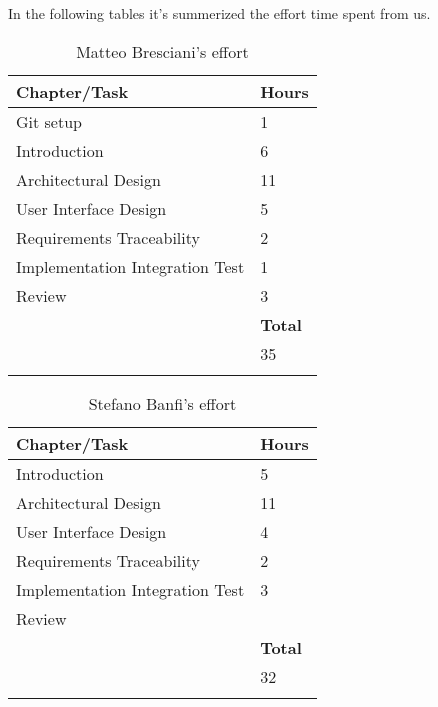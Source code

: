 In the following tables it's summerized the effort time spent from us. 

	\begin{longtable}{| p{5 cm} | p{1 cm} |} 
			\hline
			{\bf Chapter/Task} & {\bf Hours}\\
			\hline
            Git setup & 1 \\
			Introduction & 6 \\
			Architectural Design & 11 \\
			User Interface Design & 5\\
			Requirements Traceability & 2 \\
			Implementation Integration Test & 1 \\
            Review & 3 \\
			\hline
			&  {\bf Total} \\
			\hline
			&  35 \\
			\hline
			\caption{Matteo Bresciani's effort}
		\end{longtable}

			\begin{longtable}{| p{5 cm} | p{1 cm} |} 
			\hline
			{\bf Chapter/Task} & {\bf Hours}\\
			\hline
			Introduction & 5 \\
			Architectural Design & 11 \\
			User Interface Design & 4 \\
			Requirements Traceability & 2 \\
			Implementation Integration Test & 3 \\
            Review & \\
			\hline
			&  {\bf Total} \\
			\hline
			&  32 \\
			\hline
			\caption{Stefano Banfi's effort}
		\end{longtable}
	